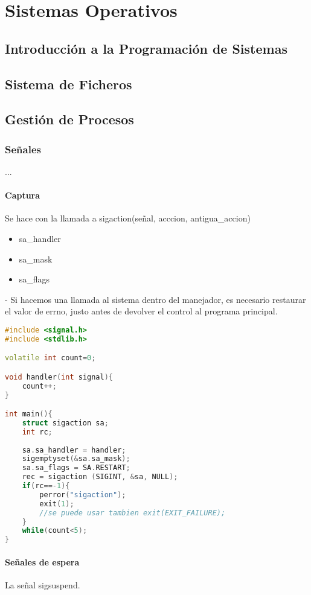 \chapter{Sistemas Operativos}
\section{Introducción a la Programación de Sistemas}
\section{Sistema de Ficheros}
\section{Gestión de Procesos}
\subsection{Señales}
...
\subsubsection{Captura}
Se hace con la llamada a sigaction(señal, acccion, antigua\_accion)
\begin{itemize}
    \item sa\_handler
    \item sa\_mask
    \item sa\_flags
\end{itemize}
- Si hacemos una llamada al sistema dentro del manejador, es necesario restaurar el valor de errno, justo antes de devolver el control al programa principal.
\begin{lstlisting}[language=C++]
#include <signal.h>
#include <stdlib.h>

volatile int count=0;

void handler(int signal){
    count++;
}

int main(){
    struct sigaction sa;
    int rc;
    
    sa.sa_handler = handler;
    sigemptyset(&sa.sa_mask);
    sa.sa_flags = SA.RESTART;
    rec = sigaction (SIGINT, &sa, NULL);
    if(rc==-1){
        perror("sigaction");
        exit(1);
        //se puede usar tambien exit(EXIT_FAILURE);
    }
    while(count<5);
}
\end{lstlisting}
\subsubsection{Señales de espera}
La señal sigsuspend.
